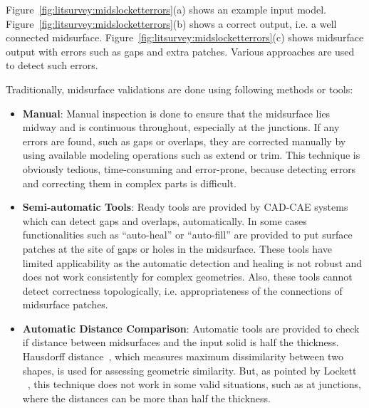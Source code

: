 
Figure~\ref{fig:litsurvey:midslocketterrors}(a) shows an example input model. Figure~\ref{fig:litsurvey:midslocketterrors}(b) shows a correct output, i.e. a well connected midsurface. Figure~\ref{fig:litsurvey:midslocketterrors}(c) shows midsurface output with errors such as gaps and extra patches. Various approaches are used to detect such errors.

Traditionally, midsurface validations are done using following methods or tools:

\begin{itemize}
[noitemsep,topsep=2pt,parsep=2pt,partopsep=2pt]
\item \textbf{Manual}: Manual inspection is done to ensure that the midsurface lies midway and is continuous throughout, especially at the junctions. If any errors are found, such as gaps or overlaps, they are corrected manually by using available modeling operations such as extend or trim.  This technique is obviously tedious, time-consuming and error-prone, because detecting errors and correcting them in complex parts is difficult.
\item \textbf{Semi-automatic Tools}: Ready tools are provided by CAD-CAE systems which can detect gaps and overlaps, automatically. In some cases functionalities such as ``auto-heal'' or ``auto-fill'' are provided to put surface patches at the site of gaps or holes in the midsurface. These tools have limited applicability as the automatic detection and healing is not robust and does not work consistently for complex geometries. Also, these tools cannot detect correctness topologically, i.e. appropriateness of the connections of midsurface patches.
\item \textbf{Automatic Distance Comparison}: Automatic tools are provided to check if distance between midsurfaces and the input solid is half the thickness. Hausdorff distance~\cite{Lockett2008}, which measures maximum dissimilarity between two shapes, is used for assessing geometric similarity. But, as pointed by Lockett ~\cite{Lockett2008}, this technique does not work in some valid situations, such as at junctions, where the distances can be more than half the thickness.%
\end{itemize}

